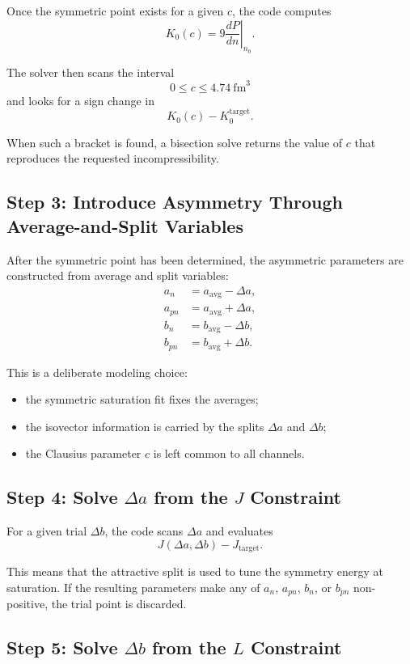 \documentclass[11pt]{article}
\begin{document}
Once the symmetric point exists for a given $c$, the code computes
\[
K_0(c) = 9 \left.\frac{dP}{dn}\right|_{n_0}.
\]

The solver then scans the interval
\[
0 \le c \le 4.74 \ \mathrm{fm}^3
\]
and looks for a sign change in
\[
K_0(c) - K_0^{\mathrm{target}}.
\]

When such a bracket is found, a bisection solve returns the value of $c$ that
reproduces the requested incompressibility.

\subsection{Step 3: Introduce Asymmetry Through Average-and-Split Variables}

After the symmetric point has been determined, the asymmetric parameters are
constructed from average and split variables:
\begin{align}
a_n &= a_{\mathrm{avg}} - \Delta a, \\
a_{pn} &= a_{\mathrm{avg}} + \Delta a, \\
b_n &= b_{\mathrm{avg}} - \Delta b, \\
b_{pn} &= b_{\mathrm{avg}} + \Delta b.
\end{align}

This is a deliberate modeling choice:
\begin{itemize}
\item the symmetric saturation fit fixes the averages;
\item the isovector information is carried by the splits $\Delta a$ and
$\Delta b$;
\item the Clausius parameter $c$ is left common to all channels.
\end{itemize}

\subsection{Step 4: Solve \texorpdfstring{$\Delta a$}{Delta a} from the \texorpdfstring{$J$}{J} Constraint}

For a given trial $\Delta b$, the code scans $\Delta a$ and evaluates
\[
J(\Delta a,\Delta b) - J_{\mathrm{target}}.
\]

This means that the attractive split is used to tune the symmetry energy at
saturation. If the resulting parameters make any of
$a_n$, $a_{pn}$, $b_n$, or $b_{pn}$ non-positive, the trial point is discarded.

\subsection{Step 5: Solve \texorpdfstring{$\Delta b$}{Delta b} from the \texorpdfstring{$L$}{L} Constraint}
\end{document}
